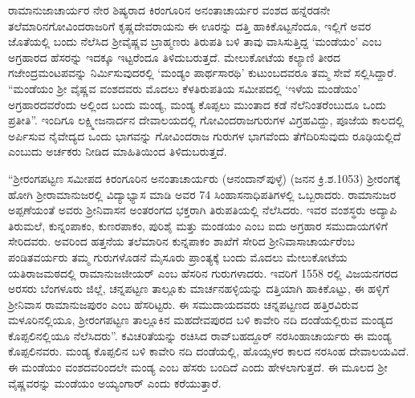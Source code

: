 ರಾಮಾನುಜಾಚಾರ್ಯರ ನೇರ ಶಿಷ್ಯರಾದ ಕಿರಂಗೂರಿನ ಅನಂತಾಚಾರ್ಯರ ವಂಶದ ಹನ್ನೆರಡನೇ ತಲೆಮಾರಿನ\break ಗೋವಿಂದರಾಜರಿಗೆ ಕೃಷ್ಣದೇವರಾಯನು ಈ ಊರನ್ನು ದತ್ತಿ ಹಾಕಿಕೊಟ್ಟನೆಂದೂ, ಇಲ್ಲಿಗೆ ಅವರ ಜೊತೆಯಲ್ಲಿ ಬಂದು ನೆಲೆಸಿದ ಶ‍್ರೀವೈಷ್ಣವ ಬ್ರಾಹ್ಮಣರು ತಿರುಪತಿ ಬಳಿ ತಾವು ವಾಸಿಸುತ್ತಿದ್ದ ‘ಮಂಡೆಯಂ’ ಎಂಬ ಅಗ್ರಹಾರದ ಹೆಸರನ್ನು ಇದಕ್ಕೂ ಇಟ್ಟರೆಂದೂ ತಿಳಿದುಬರುತ್ತದೆ. ಮೇಲುಕೋಟೆಯ ಕಲ್ಯಾಣಿ ತೀರದ ಗಜೇಂದ್ರಮಂಟಪವನ್ನು ನಿರ್ಮಿಸುವುದರಲ್ಲಿ ‘ಮಂಡ್ಯಂ ಪಾರ್ಥಸಾರಥಿ’ ಕುಟುಂಬದವರೂ ತಮ್ಮ ಸೇವೆ ಸಲ್ಲಿಸಿದ್ದಾರೆ. “ಮಂಡೆಯಂ ಶ‍್ರೀ ವೈಷ್ಣವ ವಂಶದವರು ಮೊದಲು ಕೆಳತಿರುಪತಿಯ ಸಮೀಪದಲ್ಲಿ ‘ಇಳೆಯ ಮಂಡೆಯಂ’ ಅಗ್ರಹಾರದವರೆಂದು ಅಲ್ಲಿಂದ ಬಂದು ಮಂಡ್ಯ, ಮಂಡ್ಯ ಕೊಪ್ಪಲು ಮುಂತಾದ ಕಡೆ ನೆಲೆನಿಂತರೆಂಬುದೂ ಒಂದು ಪ್ರತೀತಿ”. ಇಂದಿಗೂ ಲಕ್ಷ್ಮೀಜನಾರ್ದನ ದೇವಾಲಯದಲ್ಲಿ ಗೋವಿಂದರಾಜಗುರುಗಳ  ವಿಗ್ರಹವಿದ್ದು, ಪೂಜೆಯ ಕಾಲದಲ್ಲಿ ಅರ್ಪಿಸುವ ನೈವೇದ್ಯದ ಒಂದು ಭಾಗವನ್ನು ಗೋವಿಂದರಾಜ ಗುರುಗಳ ಭಾಗವೆಂದು ತೆಗೆದಿರಿಸುವುದು ರೂಢಿಯಲ್ಲಿದೆ ಎಂಬುದು ಅರ್ಚಕರು ನೀಡಿದ ಮಾಹಿತಿಯಿಂದ ತಿಳಿದುಬರುತ್ತದೆ.

“ಶ‍್ರೀರಂಗಪಟ್ಟಣ ಸಮೀಪದ ಕಿರಂಗೂರಿನ ಅನಂತಾಚಾರ್ಯರು (ಆನಂದಾನ್​ಪುಳ್ಳೆ) (ಜನನ ಕ್ರಿ.ಶ.1053) ಶ‍್ರೀರಂಗಕ್ಕೆ ಹೋಗಿ ಶ‍್ರೀರಾಮಾನುಜರಲ್ಲಿ ವಿದ್ಯಾಭ್ಯಾಸ ಮಾಡಿ ಅವರ 74 ಸಿಂಹಾಸನಾಧಿಪತಿಗಳಲ್ಲಿ ಒಬ್ಬರಾದರು. ರಾಮಾನುಜರ ಅಪ್ಪಣೆಯಂತೆ ಅವರು ಶ‍್ರೀನಿವಾಸನ ಅಂತರಂಗದ ಭಕ್ತರಾಗಿ ತಿರುಪತಿಯಲ್ಲಿ ನೆಲೆಸಿದರು. ಇವರ ವಂಶಸ್ಥರು ಅದ್ಯಾಪಿ ತಿರುಮಲೆ, ಕುನ್ನಂಪಾಕಂ, ಕುಣರಪಾಕಂ, ಪುರಿಶೈ ಮತ್ತು ಮಂಡಯಂ ಎಂಬ ಐದು ಅಗ್ರಹಾರ ಸಮುದಾಯಗಳಿಗೆ ಸೇರಿದವರು. ಅವರಿಂದ ಹತ್ತನೆಯ ತಲೆಮಾರಿನ ಕುನ್ನಪಾಕಂ ಶಾಖೆಗೆ ಸೇರಿದ ಶ‍್ರೀನಿವಾಸಾಚಾರ್ಯರೆಂಬ ಪಂಡಿತವರ್ಯರು ತಮ್ಮ ಗುರುಗಳೊಡನೆ ಮೈಸೂರು ಪ್ರಾಂತ್ಯಕ್ಕೆ ಬಂದು ಮೊದಲು ಮೇಲುಕೋಟೆಯ ಯತಿರಾಜಮಠದಲ್ಲಿ ರಾಮಾನುಜಜೀಯರ್​ ಎಂಬ ಹೆಸರಿನ ಗುರುಗಳಾದರು. ಇವರಿಗೆ 1558 ರಲ್ಲಿ ವಿಜಯನಗರದ ಅರಸರು ಬೆಂಗಳೂರು ಜಿಲ್ಲೆ, ಚನ್ನಪಟ್ಟಣ ತಾಲ್ಲೂಕು ಮಾರ್ಚನಹಳ್ಳಿಯನ್ನು ದತ್ತಿಯಾಗಿ ಹಾಕಿಕೊಟ್ಟು, ಈ ಹಳ್ಳಿಗೆ ಶ‍್ರೀನಿವಾಸ ರಾಮಾನುಜಪುರಂ ಎಂಬ ಹೆಸರಿಟ್ಟರು. ಈ ಸಮುದಾಯದವರು ಚನ್ನಪಟ್ಟಣದ ಹತ್ತಿರವಿರುವ ಮಳೂರಿನಲ್ಲಿಯೂ, ಶ‍್ರೀರಂಗಪಟ್ಟಣ ತಾಲ್ಲೂಕಿನ ಮಹದೇವಪುರದ ಬಳಿ ಕಾವೇರಿ ನದಿ ದಂಡೆಯಲ್ಲಿರುವ ಮಂಡ್ಯದ ಕೊಪ್ಪಲಿನಲ್ಲಿಯೂ ನೆಲೆಸಿದರು”. ಕವಿಚರಿತೆಯನ್ನು ರಚಿಸಿದ ರಾವ್​ಬಹದ್ದೂರ್​ ನರಸಿಂಹಾಚಾರ್ಯರು ಈ ಮಂಡ್ಯ ಕೊಪ್ಪಲಿನವರು. ಮಂಡ್ಯ ಕೊಪ್ಪಲಿನ ಬಳಿ ಕಾವೇರಿ ನದಿ ದಂಡೆಯಲ್ಲಿ, ಹೊಯ್ಸಳರ ಕಾಲದ ನರಸಿಂಹ ದೇವಾಲಯವಿದೆ. ಈ ಮಂಡೆಯಂ ವಂಶದವರಿಂದಲೇ ಮಂಡ್ಯ ಎಂಬ ಹೆಸರು ಬಂದಿದೆ ಎಂದು ಹೇಳಲಾಗುತ್ತದೆ. ಈ ಮೂಲದ ಶ‍್ರೀ ವೈಷ್ಣವರನ್ನು ಮಂಡೆಯಂ ಅಯ್ಯಂಗಾರ್​ ಎಂದು ಕರೆಯುತ್ತಾರೆ.



